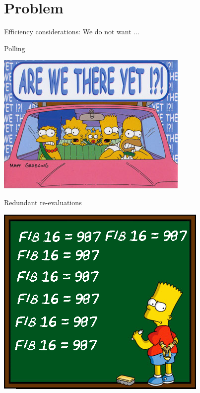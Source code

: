 \documentclass{beamer}
\begin{document}
\section{Problem}
\begin{frame}{Efficiency considerations: We do not want ...}
\begin{block}{Polling}
\vspace{-0.45cm}
\begin{center}
\includegraphics[scale=0.33]{are-we-there-yet.jpg} 
\end{center}
\vspace{-0.5cm}
\end{block}
\begin{block}{Redundant re-evaluations}
\vspace{-0.45cm}
\begin{center}
\includegraphics[scale=0.28]{recompute.png}
\end{center}
\vspace{-0.5cm}
\end{block}

\end{frame}
\end{document}
